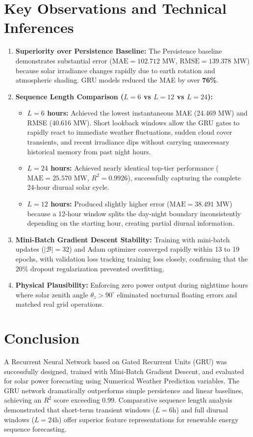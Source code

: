 \documentclass[12pt,a4paper]{article}
\begin{document}
\section*{Key Observations and Technical Inferences}
\begin{enumerate}
    \item \textbf{Superiority over Persistence Baseline:} The Persistence baseline demonstrates substantial error ($\text{MAE} = 102.712\text{ MW}$, $\text{RMSE} = 139.378\text{ MW}$) because solar irradiance changes rapidly due to earth rotation and atmospheric shading. GRU models reduced the MAE by over \textbf{76\%}.
    \item \textbf{Sequence Length Comparison ($L=6$ vs $L=12$ vs $L=24$):}
    \begin{itemize}
        \item \textbf{$L=6$ hours:} Achieved the lowest instantaneous MAE (24.469 MW) and RMSE (40.616 MW). Short lookback windows allow the GRU gates to rapidly react to immediate weather fluctuations, sudden cloud cover transients, and recent irradiance dips without carrying unnecessary historical memory from past night hours.
        \item \textbf{$L=24$ hours:} Achieved nearly identical top-tier performance ($\text{MAE} = 25.570\text{ MW}$, $R^2 = 0.9926$), successfully capturing the complete 24-hour diurnal solar cycle.
        \item \textbf{$L=12$ hours:} Produced slightly higher error ($\text{MAE} = 38.491\text{ MW}$) because a 12-hour window splits the day-night boundary inconsistently depending on the starting hour, creating partial diurnal information.
    \end{itemize}
    \item \textbf{Mini-Batch Gradient Descent Stability:} Training with mini-batch updates ($|\mathcal{B}|=32$) and Adam optimizer converged rapidly within 13 to 19 epochs, with validation loss tracking training loss closely, confirming that the 20\% dropout regularization prevented overfitting.
    \item \textbf{Physical Plausibility:} Enforcing zero power output during nighttime hours where solar zenith angle $\theta_z > 90^\circ$ eliminated nocturnal floating errors and matched real grid operations.
\end{enumerate}

\section*{Conclusion}
A Recurrent Neural Network based on Gated Recurrent Units (GRU) was successfully designed, trained with Mini-Batch Gradient Descent, and evaluated for solar power forecasting using Numerical Weather Prediction variables. The GRU network dramatically outperforms simple persistence and linear baselines, achieving an $R^2$ score exceeding 0.99. Comparative sequence length analysis demonstrated that short-term transient windows ($L=6$h) and full diurnal windows ($L=24$h) offer superior feature representations for renewable energy sequence forecasting.
\end{document}
